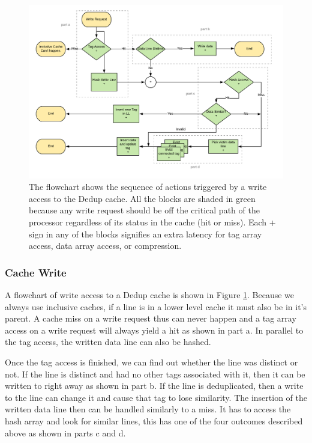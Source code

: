 \begin{figure}[h]
    \includegraphics[width=\textwidth]{Dedup_Write.pdf}
    \caption[Dedup Write]{The flowchart shows the sequence of actions triggered by a write access to the Dedup cache. All the blocks are shaded in green because any write request should be off the critical path of the processor regardless of its status in the cache (hit or miss). Each + sign in any of the blocks signifies an extra latency for tag array access, data array access, or compression.}
    \label{fig:Dedup_Write}
\end{figure}
\subsubsection{Cache Write}
A flowchart of write access to a Dedup cache is shown in Figure \ref{fig:Dedup_Write}. Because we always use inclusive caches, if a line is in a lower level cache it must also be in it's parent. A cache miss on a write request thus can never happen and a tag array access on a write request will always yield a hit as shown in part a. In parallel to the tag access, the written data line can also be hashed.\par
Once the tag access is finished, we can find out whether the line was distinct or not. If the line is distinct and had no other tags associated with it, then it can be written to right away as shown in part b. If the line is deduplicated, then a write to the line can change it and cause that tag to lose similarity. The insertion of the written data line then can be handled similarly to a miss. It has to access the hash array and look for similar lines, this has one of the four outcomes described above as shown in parts c and d.
